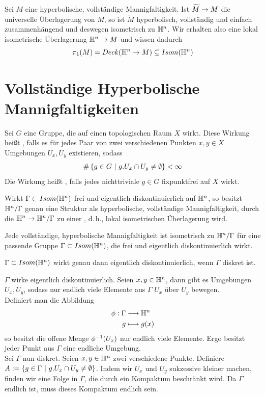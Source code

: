 \documentclass{book}
\begin{document}
\Bem{}
Sei $M$ eine hyperbolische, vollständige Mannigfaltigkeit. Ist $\widetilde{M} \overset{}{\rightarrow} M$ die universelle Überlagerung von $M$, so ist $\widetilde{M}$ hyperbolisch, vollständig und einfach zusammenhängend und deswegen isometrisch zu $\mathbb{H}^n$. Wir erhalten also eine lokal isometrische Überlagerung $\mathbb{H}^n \overset{}{\rightarrow} M$ und wissen dadurch
\[ \pi_1(M) = Deck(\mathbb{H}^n \overset{}{\rightarrow} M) \subseteq Isom(\mathbb{H}^n) \]

\section{Vollständige Hyperbolische Mannigfaltigkeiten}
\Def{}
Sei $G$ eine Gruppe, die auf einen topologischen Raum $X$ wirkt. Diese Wirkung heißt , falls es für jedes Paar von zwei verschiedenen Punkten $x,y \in X$ Umgebungen $U_x, U_y$ existieren, sodass
\[ \#\set{g \in G}{g.U_x \cap U_y \neq \emptyset} < \infty \]
Die Wirkung heißt , falls jedes nichttriviale $g\in G$ fixpunktfrei auf $X$ wirkt.

\Lem{}
Wirkt $\Gamma \subset Isom(\mathbb{H}^n)$ frei und eigentlich diskontinuierlich auf $\mathbb{H}^n$, so besitzt $\mathbb{H}^n / \Gamma$ genau eine Struktur als hyperbolische, vollständige Mannigfaltigkeit, durch die $\mathbb{H}^n \overset{}{\rightarrow} \mathbb{H}^n/\Gamma$ zu einer , d.\,h., lokal isometrischen Überlagerung wird.

\Prop{}
Jede vollständige, hyperbolische Mannigfaltigkeit ist isometrisch zu $\mathbb{H}^n / \Gamma$ für eine passende Gruppe $\Gamma \subset Isom(\mathbb{H}^n)$, die frei und eigentlich diskontinuierlich wirkt.

\Bem{}
$\Gamma \subset  Isom(\mathbb{H}^n)$ wirkt genau dann eigentlich diskontinuierlich, wenn $\Gamma$ diskret ist.
\begin{Beweis}{}
	$\Gamma$ wirke eigentlich diskontinuierlich. Seien $x,y \in \mathbb{H}^n$, dann gibt es Umgebungen $U_x, U_y$, sodass nur endlich viele Elemente aus $\Gamma$ $U_x$ über $U_y$ bewegen.\\
	Definiert man die Abbildung
	\begin{align*}
	\phi : \Gamma& \overset{}{\longrightarrow} \mathbb{H}^n\\
	g & \longmapsto g(x)
	\end{align*}
	so besitzt die offene Menge $\phi^{-1}(U_x)$ nur endlich viele Elemente. Ergo besitzt jeder Punkt aus $\Gamma$ eine endliche Umgebung.\\
	Sei $\Gamma$ nun diskret. Seien $x,y \in \mathbb{H}^n$ zwei verschiedene Punkte. Definiere $A:= \set{g \in \Gamma}{g.U_x \cap U_y \neq \emptyset}$. Indem wir $U_x$ und $U_y$ sukzessive kleiner machen, finden wir eine Folge in $\Gamma$, die durch ein Kompaktum beschränkt wird. Da $\Gamma$ endlich ist, muss dieses Kompaktum endlich sein.
\end{Beweis}
\end{document}
